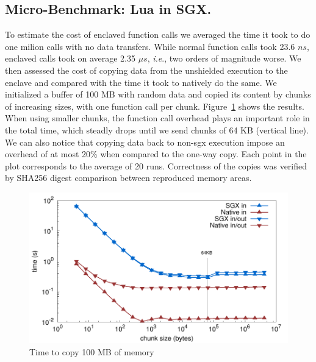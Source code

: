 \subsection{Micro-Benchmark: Lua in SGX.}
To estimate the cost of enclaved function calls we averaged the time it took to do one milion calls with no data transfers.
While normal function calls took 23.6 $ns$, enclaved calls took on average 2.35 $\mu s$, \textit{i.e}., two orders of magnitude worse.
We then assessed the cost of copying data from the unshielded execution to the enclave and compared with the time it took to natively do the same.
We initialized a buffer of 100 MB with random data and copied its content by chunks of increasing sizes, with one function call per chunk.
Figure~\ref{fig:sgxmemcpy} shows the results.
When using smaller chunks, the function call overhead plays an important role in the total time, which steadly drops until we send chunks of 64 KB (vertical line).
We can also notice that copying data back to non-sgx execution impose an overhead of at most 20\% when compared to the one-way copy.
Each point in the plot corresponds to the average of 20 runs. Correctness of the copies was verified by SHA256 digest comparison between reproduced memory areas.

\begin{figure}[t!]
  \centering
  \includegraphics[scale=0.45]{plots/memcpy/memcpy.pdf}
  \caption{Time to copy 100 MB of memory}
  \label{fig:sgxmemcpy}
\end{figure}


